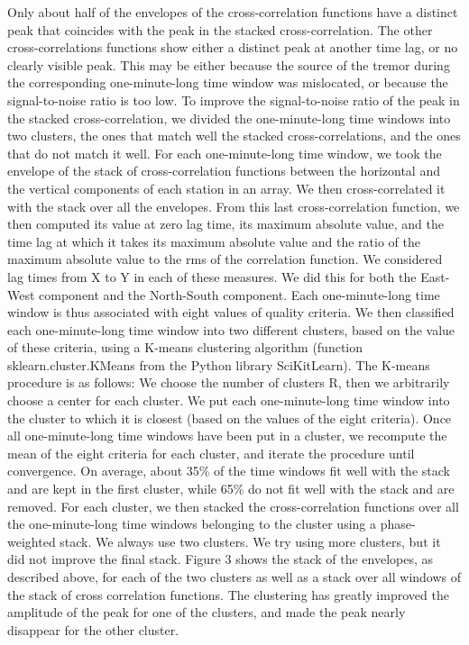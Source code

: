 \documentclass[draft]{agujournal2019}
\begin{document}
Only about half of the envelopes of the cross-correlation functions have a distinct peak that coincides with the peak in the stacked cross-correlation. The other cross-correlations functions show either a distinct peak at another time lag, or no clearly visible peak. This may be either because the source of the tremor during the corresponding one-minute-long time window was mislocated, or because the signal-to-noise ratio is too low. To improve the signal-to-noise ratio of the peak in the stacked cross-correlation, we divided the one-minute-long time windows into two clusters, the ones that match well the stacked cross-correlations, and the ones that do not match it well. For each one-minute-long time window, we took the envelope of the stack of cross-correlation functions between the horizontal and the vertical components of each station in an array.  We then cross-correlated it with the stack over all the envelopes. From this last cross-correlation function, we then computed its value at zero lag time, its maximum absolute value, and the time lag at which it takes its maximum absolute value and the ratio of the maximum absolute value to the rms of the correlation function.  We considered lag times from X to Y in each of these measures. We did this for both the East-West component and the North-South component. Each one-minute-long time window is thus associated with eight values of quality criteria. We then classified each one-minute-long time window into two different clusters, based on the value of these criteria, using a K-means clustering algorithm (function sklearn.cluster.KMeans from the Python library SciKitLearn). The K-means procedure is as follows: We choose the number of clusters R, then we arbitrarily choose a center for each cluster. We put each one-minute-long time window into the cluster to which it is closest (based on the values of the eight criteria). Once all one-minute-long time windows have been put in a cluster, we recompute the mean of the eight criteria for each cluster, and iterate the procedure until convergence. On average, about 35\% of the time windows fit well with the stack and are kept in the first cluster, while 65\% do not fit well with the stack and are removed. For each cluster, we then stacked the cross-correlation functions over all the one-minute-long time windows belonging to the cluster using a phase-weighted stack. We always use two clusters. We try using more clusters, but it did not improve the final stack. Figure 3 shows the stack of the envelopes, as described above, for each of the two clusters as well as a stack over all windows of the stack of cross correlation functions. The clustering has greatly improved the amplitude of the peak for one of the clusters, and made the peak nearly disappear for the other cluster.
\end{document}

